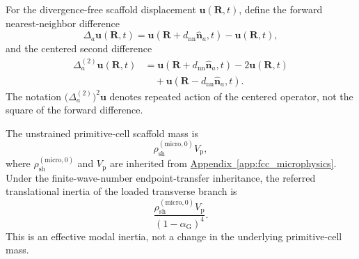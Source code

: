 For the divergence-free scaffold displacement
\(\mathbf u(\mathbf R,t)\), define the forward nearest-neighbor difference
\begin{equation}
    \Delta_a\mathbf u(\mathbf R,t)
    =
    \mathbf u
    \left(
        \mathbf R
        +
        d_{\mathrm{nn}}
        \widehat{\mathbf n}_a,
        t
    \right)
    -
    \mathbf u(\mathbf R,t),
    \label{eq:photon_relaxation_first_difference}
\end{equation}
and the centered second difference
\begin{align}
    \Delta_a^{(2)}
    \mathbf u(\mathbf R,t)
    &=
    \mathbf u
    \left(
        \mathbf R
        +
        d_{\mathrm{nn}}
        \widehat{\mathbf n}_a,
        t
    \right)
    -
    2\mathbf u(\mathbf R,t)
    \nonumber\\
    &\quad
    +
    \mathbf u
    \left(
        \mathbf R
        -
        d_{\mathrm{nn}}
        \widehat{\mathbf n}_a,
        t
    \right).
    \label{eq:photon_relaxation_second_difference}
\end{align}
The notation
\(\bigl(\Delta_a^{(2)}\bigr)^2\mathbf u\)
denotes repeated action of the centered operator, not the square of the
forward difference.

The unstrained primitive-cell scaffold mass is
\begin{equation}
    \rho_{\mathrm{sh}}^{(\mathrm{micro},0)}
    V_{\mathrm p},
    \label{eq:photon_relaxation_cell_mass}
\end{equation}
where
\(\rho_{\mathrm{sh}}^{(\mathrm{micro},0)}\)
and \(V_{\mathrm p}\) are inherited from
\hyperref[app:fcc_microphysics]{Appendix~\ref*{app:fcc_microphysics}}.
Under the finite-wave-number endpoint-transfer inheritance, the referred
translational inertia of the loaded transverse branch is
\begin{equation}
    \frac{
        \rho_{\mathrm{sh}}^{(\mathrm{micro},0)}
        V_{\mathrm p}
    }{
        \left(
            1-\alpha_{\mathrm G}
        \right)^4
    }.
    \label{eq:photon_relaxation_loaded_cell_inertia}
\end{equation}
This is an effective modal inertia, not a change in the underlying
primitive-cell mass.

